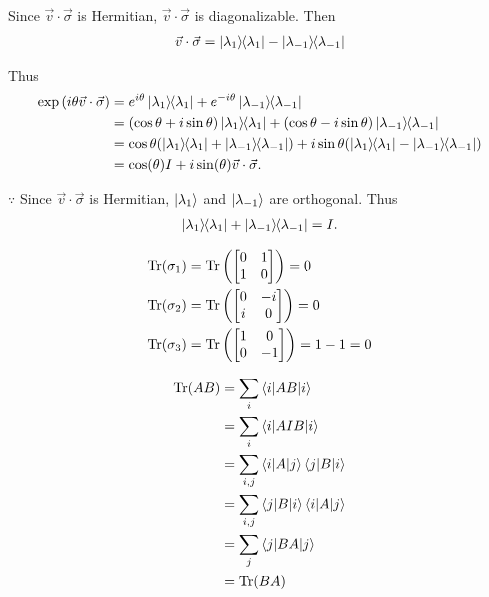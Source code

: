 Since $\vec{v} \cdot \vec{\sigma}$ is Hermitian,  $\vec{v} \cdot \vec{\sigma}$ is diagonalizable.
Then
\begin{align*}
	\vec{v} \cdot \vec{\sigma} = \ket{\lambda_1}\hspace{-1mm} \bra{\lambda_1} - \ket{\lambda_{-1}}\hspace{-1mm} \bra{\lambda_{-1}}
\end{align*}

Thus
\begin{align*}
	\exp \left(i \theta \vec{v} \cdot \vec{\sigma} \right) &=
	e^{i \theta} \kb{\lambda_1}  + e^{-i \theta} \kb{\lambda_{-1}}\\
	&= (\cos \theta + i \sin \theta) \kb{\lambda_1} + (\cos \theta - i \sin \theta) \kb{\lambda_{-1}}\\
	&= \cos \theta (\kb{\lambda_1} + \kb{\lambda_{-1}}) + i \sin \theta (\kb{\lambda_1} - \kb{\lambda_{-1}}) \\
	&= \cos( \theta) I + i \sin (\theta) \vec{v} \cdot \vec{\sigma}.
\end{align*}

$\because$ Since $\vec{v} \cdot \vec{\sigma}$ is Hermitian, $\ket{\lambda_1}$ and $\ket{\lambda_{-1}}$ are orthogonal.
Thus
\begin{align*}
	\ket{\lambda_1}\hspace{-1mm} \bra{\lambda_1} + \ket{\lambda_{-1}}\hspace{-1mm} \bra{\lambda_{-1}} = I.
\end{align*}


\begin{align*}
	\Tr (\sigma_1) &= \Tr \left(
		\begin{bmatrix}
		0 & 1 \\
		1 & 0
		\end{bmatrix}
	\right) = 0\\
%
	\Tr (\sigma_2) &= \Tr \left(
		\begin{bmatrix}
		0 & -i \\
		i & 0
		\end{bmatrix}
	\right) = 0\\
%
	\Tr (\sigma_3) &= \Tr \left(
	\begin{bmatrix}
		1 & 0 \\
		0 & -1
	\end{bmatrix}
	\right) = 1 -1 = 0\\
\end{align*}




\begin{align*}
	\operatorname{Tr} (AB) &= \sum_i \braket{i | AB | i}\\
		&=\sum_i \braket{i | A I B | i}\\
		&= \sum_{i,j} \braket{i | A | j}\braket{j | B | i}\\
		&= \sum_{i,j} \braket{j | B | i} \braket{i | A | j}\\
		&= \sum_j \braket{j | BA | j}\\
		&= \operatorname{Tr} (BA)
\end{align*}



